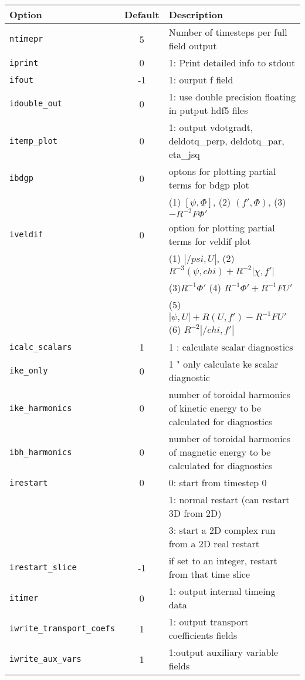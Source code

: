 \begin{tabular}{lcp{4in}}
  \textbf{Option}&\textbf{Default}&\textbf{Description}\\
  \hline
  \texttt{ntimepr}   & 5 & Number of timesteps per full field output\\
  \texttt{iprint}    & 0 & 1: Print detailed info to stdout\\
 \texttt{ifout}      & -1 & 1: ourput f field \\
 \texttt{idouble\_out} & 0 & 1: use double precision floating in putput hdf5 files \\
 \texttt{itemp\_plot}  & 0 & 1: output vdotgradt, deldotq\_perp, deldotq\_par, eta\_jsq \\
 \texttt{ibdgp}        & 0 & optons for plotting partial terms for bdgp plot \\
                       &   & (1) $[ \psi, \Phi] $, (2) $(f\prime,\Phi) $, (3) $-R^{-2} F \Phi \prime$ \\
 \texttt{iveldif}      & 0 & option for plotting partial terms for veldif plot \\
                       &   & (1) $|/psi,U|$, (2) $R^{-3}(\psi,chi) + R^{-2}|\chi,f\prime|$ \\
                       &   & (3)$ R^{-1} \Phi \prime$   (4) $R^{-1} \Phi \prime + R^{-1} F U\prime $ \\
                       &   & (5) $|\psi,U| + R(U,f\prime) - R^{-1}F U\prime $ (6) $R^{-2} |/chi,f\prime| $ \\
 \texttt{icalc\_scalars} & 1 & 1 : calculate scalar diagnostics \\
 \texttt{ike\_only}      & 0 & 1 " only calculate ke scalar diagnostic \\
 \texttt{ike\_harmonics} & 0 & number of toroidal harmonics of kinetic energy to be calculated for diagnostics \\
 \texttt{ibh\_harmonics} & 0 & number of toroidal harmonics of magnetic energy to be calculated for diagnostics \\
 \texttt{irestart}       & 0 & 0: start from timestep 0 \\
                         &   & 1: normal restart (can restart 3D from 2D) \\
                         &   & 3: start a 2D complex run from a 2D real restart \\
 \texttt{irestart\_slice}  & -1 & if set to an integer, restart from that time slice \\
 \texttt{itimer}           & 0 & 1: output internal timeing data \\
 \texttt{iwrite\_transport\_coefs}  & 1 & 1: output transport coefficients fields \\
 \texttt{iwrite\_aux\_vars}         & 1 & 1:output auxiliary variable fields \\

\end{tabular}


